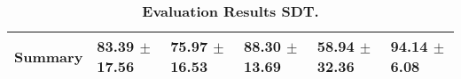 \begin{table}[htb]
{\begin{tabular}{llllll}
\midrule
\textbf{Summary                                  } &                  \phantom{0}83.39 $\pm$ 17.56 &                      \phantom{0}75.97 $\pm$ 16.53 &                  \phantom{0}88.30 $\pm$ 13.69 &            \phantom{0}58.94 $\pm$ 32.36 &  \phantom{0}94.14 $\pm$ \phantom{0}6.08 \\
\bottomrule
\end{tabular}%
}
\caption{\textbf{Evaluation Results SDT.}}
\label{tab:eval-results}
\end{table}
\newpage 
